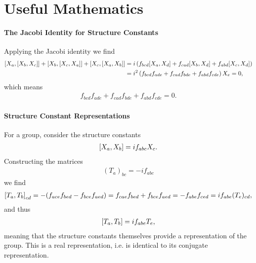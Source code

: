 \section{Useful Mathematics}

\paragraph{The Jacobi Identity for Structure Constants}
Applying the Jacobi identity we find
\begin{align*}
	\comm{X_{a}}{\comm{X_{b}}{X_{c}}} + \comm{X_{b}}{\comm{X_{c}}{X_{a}}} + \comm{X_{c}}{\comm{X_{a}}{X_{b}}} &= i\left(f_{bcd}\comm{X_{a}}{X_{d}} + f_{cad}\comm{X_{b}}{X_{d}} + f_{abd}\comm{X_{c}}{X_{d}}\right) \\
                                      &= i^{2}\left(f_{bcd}f_{ade} + f_{cad}f_{bde} + f_{abd}f_{cde}\right)X_{e} = 0,
\end{align*}
which means
\begin{align*}
	f_{bcd}f_{ade} + f_{cad}f_{bde} + f_{abd}f_{cde} = 0.
\end{align*}

\paragraph{Structure Constant Representations}
For a group, consider the structure constants
\begin{align*}
	\comm{X_{a}}{X_{b}} = if_{abc}X_{c}.
\end{align*}
Constructing the matrices
\begin{align*}
	(T_{a})_{bc} = -if_{abc}
\end{align*}
we find
\begin{align*}
	\comm{T_{a}}{T_{b}}_{cd} = -(f_{ace}f_{bed} - f_{bce}f_{aed}) = f_{cae}f_{bed} + f_{bce}f_{aed} = -f_{abe}f_{ced} = if_{abe}(T_{e})_{cd},
\end{align*}
and thus
\begin{align*}
	\comm{T_{a}}{T_{b}} = if_{abe}T_{e},
\end{align*}
meaning that the structure constants themselves provide a representation of the group. This is a real representation, i.e. is identical to its conjugate representation.

